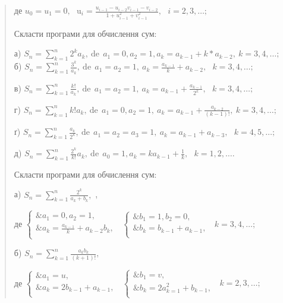 \documentclass[]{article}
\begin{document}
\begin{quote}
де
\(u_{0} = u_{1} = 0,\mathrm{\text{\ \ \ \ }}\mathrm{u}_{i} = \frac{u_{i - 1} - u_{i - 2}v_{i - 1} - v_{i - 2}}{1 + u_{i - 1}^{2} + v_{i - 1}^{2}},\mathrm{\text{\ \ \ }}i = 2,3,\ldots;\)

Скласти програми для обчислення сум:

а)
\(S_{n} = \sum_{k = 1}^{n}{2^{k}a_{k}},\mathrm{\ de\ \ }a_{1} = 0,a_{2} = 1,a_{k} = a_{k - 1} + k*a_{k - 2},\ k = 3,4,\ldots;\)
б)
\(S_{n} = \sum_{k = 1}^{n}\frac{3^{k}}{a_{k}},\mathrm{\ de\ \ }a_{1} = a_{2} = 1,\ a_{k} = \frac{a_{k - 1}}{k} + a_{k - 2},\mathrm{\text{\ \ }}k = 3,4,\ldots;\)

в)
\(S_{n} = \sum_{k = 1}^{n}\frac{k!}{a_{k}},\mathrm{\ de\ \ }a_{1} = a_{2} = 1,\ a_{k} = a_{k - 1} + \frac{a_{k - 1}}{2^{k}},\mathrm{\text{\ \ }}k = 3,4,\ldots;\)

г)
\(S_{n} = \sum_{k = 1}^{n}{k!a_{k}},\mathrm{\ de\ \ }a_{1} = 0,a_{2} = 1,\ a_{k} = a_{k - 1} + \frac{a_{k - 2}}{(k - 1)!},\ k = 3,4,\ldots;\)

ґ)
\(S_{n} = \sum_{k = 1}^{n}\frac{a_{k}}{2^{k}},\mathrm{\ de\ \ }a_{1} = a_{2} = a_{3} = 1,\ a_{k} = a_{k - 1} + a_{k - 3},\mathrm{\text{\ \ }}k = 4,5,\ldots;\)

д)
\(S_{n} = \sum_{k = 1}^{n}{\frac{2^{k}}{k!}a_{k}},\mathrm{\ de\ \ }a_{0} = 1,a_{k} = ka_{k - 1} + \frac{1}{k},\mathrm{\text{\ \ }}k = 1,2,\ldots.\)

\protect\hypertarget{_Hlk65241776}{}{}Скласти програми для обчислення
сум:

а) \(S_{n} = \sum_{k = 1}^{n}\frac{2^{k}}{a_{k} + b_{k}},\) ,

де \(\left\{ \begin{matrix}
\& a_{1} = 0,a_{2} = 1, \\
\& a_{k} = \frac{a_{k - 1}}{k} + a_{k - 2}b_{k}, \\
\end{matrix} \right.\ \) \(\left\{ \begin{matrix}
\& b_{1} = 1,b_{2} = 0, \\
\& b_{k} = b_{k - 1} + a_{k - 1}, \\
\end{matrix} \right.\ \) \(k = 3,4,\ldots;\)

б) \(S_{n} = \sum_{k = 1}^{n}\frac{a_{k}b_{k}}{(k + 1)!},\)

де \(\left\{ \begin{matrix}
\& a_{1} = u, \\
\& a_{k} = 2b_{k - 1} + a_{k - 1}, \\
\end{matrix} \right.\ \) \(\left\{ \begin{matrix}
\& b_{1} = v, \\
\& b_{k} = 2a_{k = 1}^{2} + b_{k - 1}, \\
\end{matrix} \right.\ \) \(k = 2,3,\ldots;\)


\end{quote}
\end{document}
